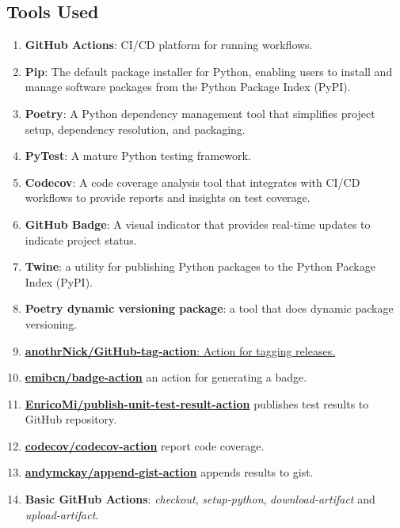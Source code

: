 \subsection{Tools Used}\label{sec:tools-used}
\begin{enumerate}
    \item \textbf{GitHub Actions}: CI/CD platform for running workflows. 
    \item \textbf{Pip}: The default package installer for Python, enabling users to install and manage software packages from the Python Package Index (PyPI).
    \item \textbf{Poetry}: A Python dependency management tool that simplifies project setup, dependency resolution, and packaging.
    \item \textbf{PyTest}: A mature Python testing framework. 
    \item \textbf{Codecov}:  A code coverage analysis tool that integrates with CI/CD workflows to provide reports and insights on test coverage.
    \item \textbf{GitHub Badge}: A visual indicator that provides real-time updates to indicate project status. 
    \item \textbf{Twine}: a utility for publishing Python packages to the Python Package Index (PyPI).
    \item \textbf{Poetry dynamic versioning package}: a tool that does dynamic package versioning.
    \item \href{https://GitHub.com/marketplace/actions/GitHub-tag-bump}{\textbf{anothrNick/GitHub-tag-action}: Action for tagging releases.}
    \item \href{https://github.com/marketplace/actions/badge-action}{\textbf{emibcn/badge-action}} an action for generating a badge. 
    \item \href{https://github.com/marketplace/actions/publish-test-results}{\textbf{EnricoMi/publish-unit-test-result-action}} publishes test results to GitHub repository. 
    \item \href{https://github.com/marketplace/actions/codecov}{\textbf{codecov/codecov-action}} report code coverage.
    \item \href{https://github.com/marketplace/actions/append-to-gist}{\textbf{andymckay/append-gist-action}} appends results to gist. 
    \item \textbf{Basic GitHub Actions}: \textit{checkout}, \textit{setup-python}, \textit{download-artifact} and \textit{upload-artifact}.
\end{enumerate}

